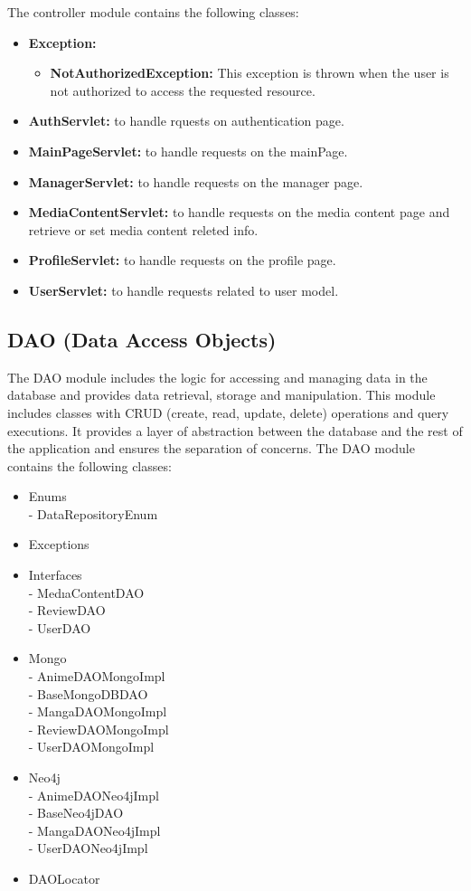The controller module contains the following classes:

\begin{itemize}
    \item \textbf{Exception:}
    \begin{itemize}
        \item \textbf{NotAuthorizedException:} This exception is thrown when the user is not authorized to access the requested resource.
    \end{itemize}
    \item \textbf{AuthServlet:} to handle rquests on authentication page.
    \item \textbf{MainPageServlet:} to handle requests on the mainPage.
    \item \textbf{ManagerServlet:} to handle requests on the manager page.
    \item \textbf{MediaContentServlet:} to handle requests on the media content page and retrieve or set media content releted info.
    \item \textbf{ProfileServlet:} to handle requests on the profile page.
    \item \textbf{UserServlet:} to handle requests related to user model.
\end{itemize}

\subsection*{DAO (Data Access Objects)}

The DAO module includes the logic for accessing and managing data in the database and provides data retrieval, 
storage and manipulation. This module includes classes with CRUD (create, read, update, delete) operations and query executions. 
It provides a layer of abstraction between the database and the rest of the application and ensures the separation of concerns. The DAO module contains the following classes:
\begin{itemize}
    \item Enums \\
    - DataRepositoryEnum
    \item Exceptions 
    \item Interfaces \\
    - MedıaContentDAO \\
    - ReviewDAO \\
    - UserDAO 
    \item Mongo \\
    - AnimeDAOMongoImpl \\
    - BaseMongoDBDAO \\
    - MangaDAOMongoImpl \\
    - ReviewDAOMongoImpl \\
    - UserDAOMongoImpl 
    \item Neo4j \\
    - AnimeDAONeo4jImpl \\
    - BaseNeo4jDAO \\
    - MangaDAONeo4jImpl \\
    - UserDAONeo4jImpl 
    \item DAOLocator 
\end{itemize}

